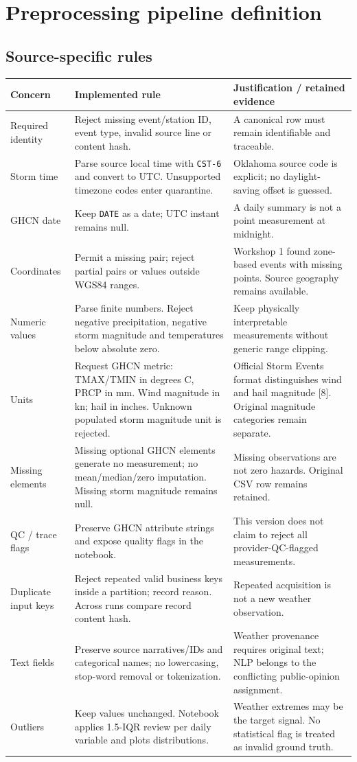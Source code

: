 \documentclass[10pt]{article}
\begin{document}
\section{Preprocessing pipeline definition}
\subsection{Source-specific rules}
\begin{longtable}{@{}L{2.6cm}L{5.6cm}L{7.0cm}@{}}
\toprule
Concern & Implemented rule & Justification / retained evidence\\
\midrule
\endhead
Required identity & Reject missing event/station ID, event type, invalid source line or content hash. &
A canonical row must remain identifiable and traceable.\\
Storm time & Parse source local time with \texttt{CST-6} and convert to UTC. Unsupported timezone codes enter quarantine. &
Oklahoma source code is explicit; no daylight-saving offset is guessed.\\
GHCN date & Keep \texttt{DATE} as a date; UTC instant remains null. &
A daily summary is not a point measurement at midnight.\\
Coordinates & Permit a missing pair; reject partial pairs or values outside WGS84 ranges. &
Workshop 1 found zone-based events with missing points. Source geography remains available.\\
Numeric values & Parse finite numbers. Reject negative precipitation, negative storm magnitude and temperatures below absolute zero. &
Keep physically interpretable measurements without generic range clipping.\\
Units & Request GHCN metric: TMAX/TMIN in degrees C, PRCP in mm. Wind magnitude in kn; hail in inches. Unknown populated storm magnitude unit is rejected. &
Official Storm Events format distinguishes wind and hail magnitude [8]. Original magnitude categories remain separate.\\
Missing elements & Missing optional GHCN elements generate no measurement; no mean/median/zero imputation. Missing storm magnitude remains null. &
Missing observations are not zero hazards. Original CSV row remains retained.\\
QC / trace flags & Preserve GHCN attribute strings and expose quality flags in the notebook. &
This version does not claim to reject all provider-QC-flagged measurements.\\
Duplicate input keys & Reject repeated valid business keys inside a partition; record reason. Across runs compare record content hash. &
Repeated acquisition is not a new weather observation.\\
Text fields & Preserve source narratives/IDs and categorical names; no lowercasing, stop-word removal or tokenization. &
Weather provenance requires original text; NLP belongs to the conflicting public-opinion assignment.\\
Outliers & Keep values unchanged. Notebook applies 1.5-IQR review per daily variable and plots distributions. &
Weather extremes may be the target signal. No statistical flag is treated as invalid ground truth.\\
\bottomrule
\end{longtable}
\end{document}
